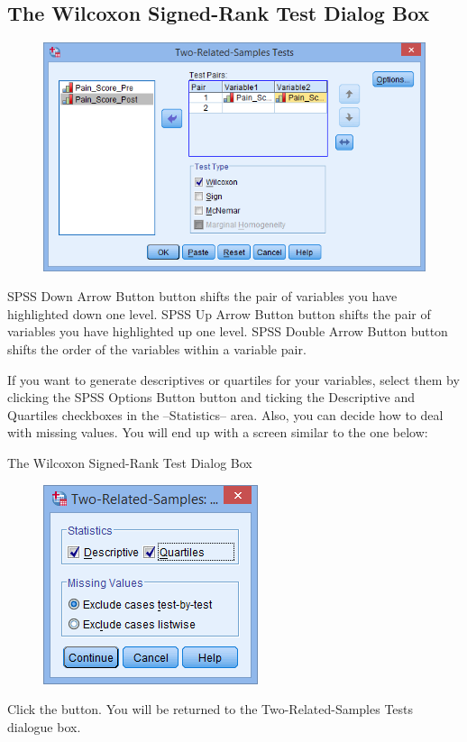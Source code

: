\documentclass[]{article}
\begin{document}
\subsection{The Wilcoxon Signed-Rank Test Dialog Box}
\begin{figure}
\centering
\includegraphics[width=0.7\linewidth]{images/wilcoxon-signed-rank-test-3}
\caption{}
\label{fig:wilcoxon-signed-rank-test-3}
\end{figure}

SPSS Down Arrow Button button shifts the pair of variables you have highlighted down one level.
SPSS Up Arrow Button button shifts the pair of variables you have highlighted up one level.
SPSS Double Arrow Button button shifts the order of the variables within a variable pair.

If you want to generate descriptives or quartiles for your variables, select them by clicking the SPSS Options Button button and ticking the Descriptive and Quartiles checkboxes in the –Statistics– area. Also, you can decide how to deal with missing values. You will end up with a screen similar to the one below:

The Wilcoxon Signed-Rank Test Dialog Box
\begin{figure}
\centering
\includegraphics[width=0.7\linewidth]{images/wilcoxon-signed-rank-test-5}
\caption{}
\label{fig:wilcoxon-signed-rank-test-5}
\end{figure}
Click the  button. You will be returned to the Two-Related-Samples Tests dialogue box.
\end{document}
